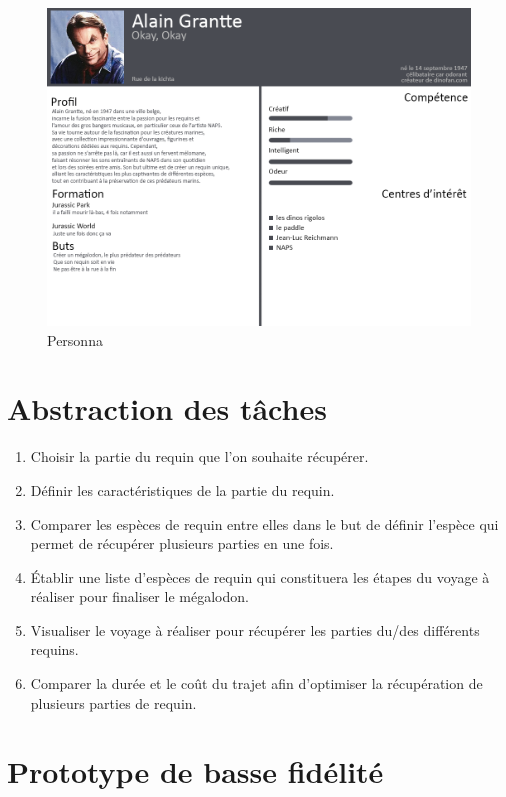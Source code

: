 \documentclass{article}
\begin{document}
\begin{figure}[!h]
	\centering
	\includegraphics[width=16.4cm]{assets/personna/alain_grantte}
	\caption{\label{assets/personna/alain_grantte} Personna}
\end{figure}

\newpage
\section{Abstraction des tâches}

\begin{enumerate}
	\item Choisir la partie du requin que l’on souhaite récupérer.
	\item Définir les caractéristiques de la partie du requin.
	\item Comparer les espèces de requin entre elles dans le but de définir l’espèce qui permet de récupérer plusieurs parties en une fois.
	\item Établir une liste d’espèces de requin qui constituera les étapes du voyage à réaliser pour finaliser le mégalodon.
	\item Visualiser le voyage à réaliser pour récupérer les parties du/des différents requins.
	\item Comparer la durée et le coût du trajet afin d’optimiser la récupération de plusieurs parties de requin.
\end{enumerate}


\newpage
\section{Prototype de basse fidélité}
\end{document}
